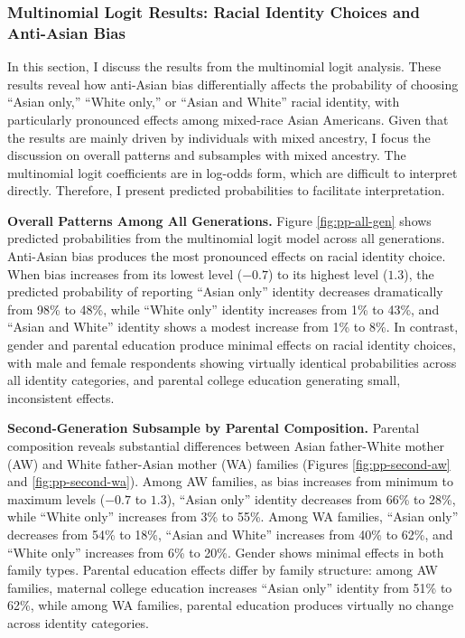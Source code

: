 \subsubsection{Multinomial Logit Results: Racial Identity Choices and Anti-Asian Bias}\label{sec:multinomial}

In this section, I discuss the results from the multinomial logit analysis. These results reveal how anti-Asian bias differentially affects the probability of choosing ``Asian only,'' ``White only,'' or ``Asian and White'' racial identity, with particularly pronounced effects among mixed-race Asian Americans. Given that the results are mainly driven by individuals with mixed ancestry, I focus the discussion on overall patterns and subsamples with mixed ancestry. The multinomial logit coefficients are in log-odds form, which are difficult to interpret directly. Therefore, I present predicted probabilities to facilitate interpretation.


\textbf{Overall Patterns Among All Generations.} Figure \ref{fig:pp-all-gen} shows predicted probabilities from the multinomial logit model across all generations. Anti-Asian bias produces the most pronounced effects on racial identity choice. When bias increases from its lowest level ($-0.7$) to its highest level ($1.3$), the predicted probability of reporting ``Asian only'' identity decreases dramatically from 98\% to 48\%, while ``White only'' identity increases from 1\% to 43\%, and ``Asian and White'' identity shows a modest increase from 1\% to 8\%. In contrast, gender and parental education produce minimal effects on racial identity choices, with male and female respondents showing virtually identical probabilities across all identity categories, and parental college education generating small, inconsistent effects.

\textbf{Second-Generation Subsample by Parental Composition.} Parental composition reveals substantial differences between Asian father-White mother (AW) and White father-Asian mother (WA) families (Figures \ref{fig:pp-second-aw} and \ref{fig:pp-second-wa}). Among AW families, as bias increases from minimum to maximum levels ($-0.7$ to $1.3$), ``Asian only'' identity decreases from 66\% to 28\%, while ``White only'' increases from 3\% to 55\%. Among WA families, ``Asian only'' decreases from 54\% to 18\%, ``Asian and White'' increases from 40\% to 62\%, and ``White only'' increases from 6\% to 20\%. Gender shows minimal effects in both family types. Parental education effects differ by family structure: among AW families, maternal college education increases ``Asian only'' identity from 51\% to 62\%, while among WA families, parental education produces virtually no change across identity categories.


